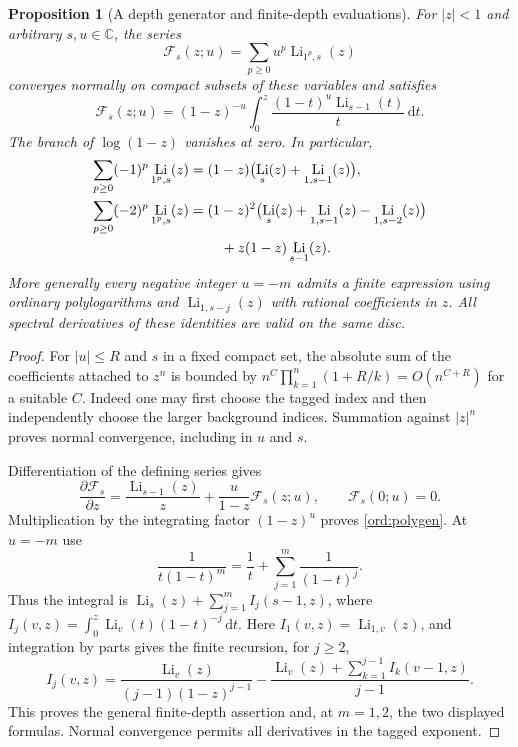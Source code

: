 \documentclass[11pt,a4paper]{article}
\numberwithin{equation}{section}
\newtheorem{proposition}[theorem]{Proposition}
\theoremstyle{definition}
\theoremstyle{remark}
\DeclareMathOperator{\Li}{Li}
\newcommand{\dd}{\mathrm d}
\begin{document}
\begin{proposition}[A depth generator and finite-depth evaluations]
\label{ord:polylog}
For $|z|<1$ and arbitrary $s,u\in\mathbb C$, the series
\[
                  \mathscr F_s(z;u)
                    =\sum_{p\ge0}u^p\Li_{1^p,s}(z)
\]
converges normally on compact subsets of these variables and satisfies
\begin{equation}\label{ord:polygen}
 \boxed{\;
 \mathscr F_s(z;u)
   =(1-z)^{-u}
           \int_0^z\frac{(1-t)^u\Li_{s-1}(t)}{t}\,\dd t.
 \;}
\end{equation}
The branch of $\log(1-z)$ vanishes at zero.  In particular,
\begin{align}
 \sum_{p\ge0}(-1)^p\Li_{1^p,s}(z)
   &=(1-z)\bigl(\Li_s(z)+\Li_{1,s-1}(z)\bigr),
       \label{ord:polyone}\\
 \sum_{p\ge0}(-2)^p\Li_{1^p,s}(z)
   &=(1-z)^2\bigl(\Li_s(z)+\Li_{1,s-1}(z)
                                  -\Li_{1,s-2}(z)\bigr)\notag\\
   &\hspace{8mm}+z(1-z)\Li_{s-1}(z).
       \label{ord:polytwo}
\end{align}
More generally every negative integer $u=-m$ admits a finite expression
using ordinary polylogarithms and $\Li_{1,s-j}(z)$ with rational
coefficients in $z$.  All spectral derivatives of these identities
are valid on the same disc.
\end{proposition}

\begin{proof}
For $|u|\le R$ and $s$ in a fixed compact set, the absolute sum of the
coefficients attached to $z^n$ is bounded by
$n^C\prod_{k=1}^n(1+R/k)=O(n^{C+R})$ for a suitable $C$.
Indeed one may first choose the tagged index and then independently
choose the larger background indices.  Summation against $|z|^n$
proves normal convergence, including in $u$ and $s$.

Differentiation of the defining series gives
\[
 \frac{\partial\mathscr F_s}{\partial z}
    =\frac{\Li_{s-1}(z)}z+\frac{u}{1-z}\mathscr F_s(z;u),
 \qquad \mathscr F_s(0;u)=0.
\]
Multiplication by the integrating factor $(1-z)^u$ proves
\eqref{ord:polygen}.  At $u=-m$ use
\[
 \frac1{t(1-t)^m}=\frac1t+\sum_{j=1}^m\frac1{(1-t)^j}.
\]
Thus the integral is $\Li_s(z)+\sum_{j=1}^m I_j(s-1,z)$, where
$I_j(v,z)=\int_0^z\Li_v(t)(1-t)^{-j}\,\dd t$.
Here $I_1(v,z)=\Li_{1,v}(z)$, and integration by parts gives the finite
recursion, for $j\ge2$,
\[
 I_j(v,z)=\frac{\Li_v(z)}{(j-1)(1-z)^{j-1}}
       -\frac{\Li_v(z)+\sum_{k=1}^{j-1}I_k(v-1,z)}{j-1}.
\]
This proves the general finite-depth assertion and, at $m=1,2$,
the two displayed formulas.  Normal convergence permits all derivatives
in the tagged exponent.
\end{proof}
\end{document}
